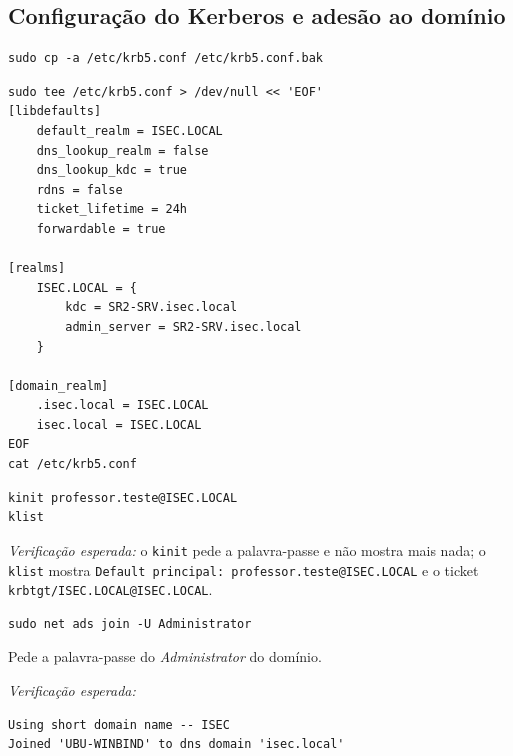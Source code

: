 
\subsection[Configuração do Kerberos e adesão ao domínio]{Configuração do Kerberos e adesão ao domínio}


\begin{lstlisting}[style=bashstyle]
sudo cp -a /etc/krb5.conf /etc/krb5.conf.bak
\end{lstlisting}


\begin{lstlisting}[style=bashstyle]
sudo tee /etc/krb5.conf > /dev/null << 'EOF'
[libdefaults]
    default_realm = ISEC.LOCAL
    dns_lookup_realm = false
    dns_lookup_kdc = true
    rdns = false
    ticket_lifetime = 24h
    forwardable = true

[realms]
    ISEC.LOCAL = {
        kdc = SR2-SRV.isec.local
        admin_server = SR2-SRV.isec.local
    }

[domain_realm]
    .isec.local = ISEC.LOCAL
    isec.local = ISEC.LOCAL
EOF
cat /etc/krb5.conf
\end{lstlisting}


\begin{lstlisting}[style=bashstyle]
kinit professor.teste@ISEC.LOCAL
klist
\end{lstlisting}

\emph{Verificação esperada:} o \texttt{kinit} pede a palavra-passe e não mostra mais nada; o \texttt{klist} mostra \texttt{Default principal: professor.teste@ISEC.LOCAL} e o ticket \texttt{krbtgt/\allowbreak{}ISEC.LOCAL@ISEC.LOCAL}.


\begin{lstlisting}[style=bashstyle]
sudo net ads join -U Administrator
\end{lstlisting}

Pede a palavra-passe do \emph{Administrator} do domínio.

\emph{Verificação esperada:}

\begin{lstlisting}[style=cfgstyle]
Using short domain name -- ISEC
Joined 'UBU-WINBIND' to dns domain 'isec.local'
\end{lstlisting}

